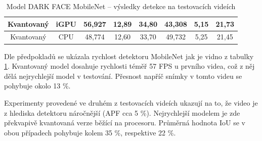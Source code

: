 \begin{table}[H]
\begin{tabular}{cc|ccc|ccc|}
  \multicolumn{1}{|c|}{\cellcolor[HTML]{E0DBDB}Kvantovaný}     & \cellcolor[HTML]{E0DBDB}iGPU & \multicolumn{1}{c|}{56,927}                                 & \multicolumn{1}{c|}{12,89}                                  & 34,80          & \multicolumn{1}{c|}{43,308}                                 & \multicolumn{1}{c|}{5,15}                                   & 21,73          \\ \hline
  \multicolumn{1}{|c|}{\cellcolor[HTML]{E0DBDB}Kvantovaný}     & \cellcolor[HTML]{E0DBDB}CPU  & \multicolumn{1}{c|}{48,774}                                 & \multicolumn{1}{c|}{12,60}                                  & 33,70          & \multicolumn{1}{c|}{49,732}                                 & \multicolumn{1}{c|}{5,25}                                   & 21,45          \\ \hline
  \end{tabular}
  \label{tabulka:dfmvidea}
  \caption{Model DARK FACE MobileNet -- výsledky detekce na testovacích videích}
\end{table}

Dle předpokladů se ukázala rychlost detektoru MobileNet jak je vidno z tabulky \ref{tabulka:dfmvidea}. Kvantovaný model dosahuje rychlosti téměř 57 FPS u prvního videa, což z něj dělá nejrychlejší model v testování. Přesnost napříč snímky v tomto videu se pohybuje okolo 13 \%. 

Experimenty provedené ve druhém z testovacích videích ukazují na to, že video je z hlediska detektoru náročnější (APF cca 5 \%). Nejrychlejší modelem je zde překvapivě kvantovaná verze běžící na procesoru. Průměrná hodnota IoU se v obou případech pohybuje kolem 35 \%, respektive 22 \%.


